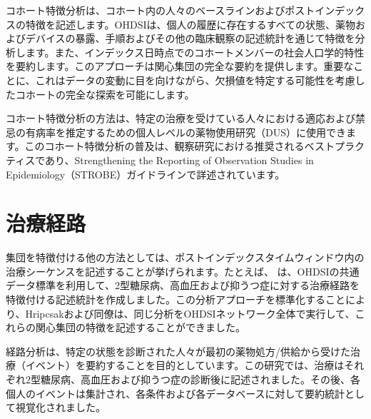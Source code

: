 \documentclass[
  11pt]{book}
\theoremstyle{definition}
\theoremstyle{definition}
\theoremstyle{definition}
\theoremstyle{definition}
\theoremstyle{remark}
\begin{document}
コホート特徴分析は、コホート内の人々のベースラインおよびポストインデックスの特徴を記述します。OHDSIは、個人の履歴に存在するすべての状態、薬物およびデバイスの暴露、手順およびその他の臨床観察の記述統計を通じて特徴を分析します。また、インデックス日時点でのコホートメンバーの社会人口学的特性を要約します。このアプローチは関心集団の完全な要約を提供します。重要なことに、これはデータの変動に目を向けながら、欠損値を特定する可能性を考慮したコホートの完全な探索を可能にします。

コホート特徴分析の方法は、特定の治療を受けている人々における適応および禁忌の有病率を推定するための個人レベルの薬物使用研究（DUS）に使用できます。このコホート特徴分析の普及は、観察研究における推奨されるベストプラクティスであり、Strengthening the Reporting of Observation Studies in Epidemiology（STROBE）ガイドラインで詳述されています。\citep[ ]{VONELM2008344}   

\section{治療経路}\label{ux6cbbux7642ux7d4cux8def}

集団を特徴付ける他の方法としては、ポストインデックスタイムウィンドウ内の治療シーケンスを記述することが挙げられます。たとえば、\citet{Hripcsak7329} は、OHDSIの共通データ標準を利用して、2型糖尿病、高血圧および抑うつ症に対する治療経路を特徴付ける記述統計を作成しました。この分析アプローチを標準化することにより、Hripcsakおよび同僚は、同じ分析をOHDSIネットワーク全体で実行して、これらの関心集団の特徴を記述することができました。   

経路分析は、特定の状態を診断された人々が最初の薬物処方/供給から受けた治療（イベント）を要約することを目的としています。この研究では、治療はそれぞれ2型糖尿病、高血圧および抑うつ症の診断後に記述されました。その後、各個人のイベントは集計され、各条件および各データベースに対して要約統計として視覚化されました。
\end{document}
